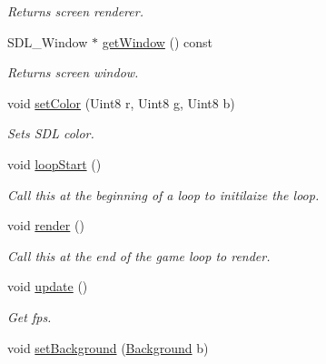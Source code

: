 \begin{DoxyCompactItemize}
\begin{DoxyCompactList}\small\item\em Returns screen renderer. \end{DoxyCompactList}\item 
S\+D\+L\+\_\+\+Window $\ast$ \hyperlink{classEngine_ab95d74b94f8eafd11bf6c8fbf5b34a8f}{get\+Window} () const \hypertarget{classEngine_ab95d74b94f8eafd11bf6c8fbf5b34a8f}{}\label{classEngine_ab95d74b94f8eafd11bf6c8fbf5b34a8f}

\begin{DoxyCompactList}\small\item\em Returns screen window. \end{DoxyCompactList}\item 
void \hyperlink{classEngine_aeee842a402f260e38e0502e1d95b920b}{set\+Color} (Uint8 r, Uint8 g, Uint8 b)\hypertarget{classEngine_aeee842a402f260e38e0502e1d95b920b}{}\label{classEngine_aeee842a402f260e38e0502e1d95b920b}

\begin{DoxyCompactList}\small\item\em Sets S\+DL color. \end{DoxyCompactList}\item 
void \hyperlink{classEngine_ad7602820f1b9d75ec1b59f2a6111085e}{loop\+Start} ()\hypertarget{classEngine_ad7602820f1b9d75ec1b59f2a6111085e}{}\label{classEngine_ad7602820f1b9d75ec1b59f2a6111085e}

\begin{DoxyCompactList}\small\item\em Call this at the beginning of a loop to initilaize the loop. \end{DoxyCompactList}\item 
void \hyperlink{classEngine_a7960743aefd62e846e7f3cd92c18bc73}{render} ()\hypertarget{classEngine_a7960743aefd62e846e7f3cd92c18bc73}{}\label{classEngine_a7960743aefd62e846e7f3cd92c18bc73}

\begin{DoxyCompactList}\small\item\em Call this at the end of the game loop to render. \end{DoxyCompactList}\item 
void \hyperlink{classEngine_ad2ff110d5a86c1cd60b541d65915ac48}{update} ()
\begin{DoxyCompactList}\small\item\em Get fps. \end{DoxyCompactList}\item 
void \hyperlink{classEngine_a690ac76faed3d2a9f1f582a2e6fc8c85}{set\+Background} (\hyperlink{classBackground}{Background} b)\hypertarget{classEngine_a690ac76faed3d2a9f1f582a2e6fc8c85}{}\label{classEngine_a690ac76faed3d2a9f1f582a2e6fc8c85}


\end{DoxyCompactItemize}
